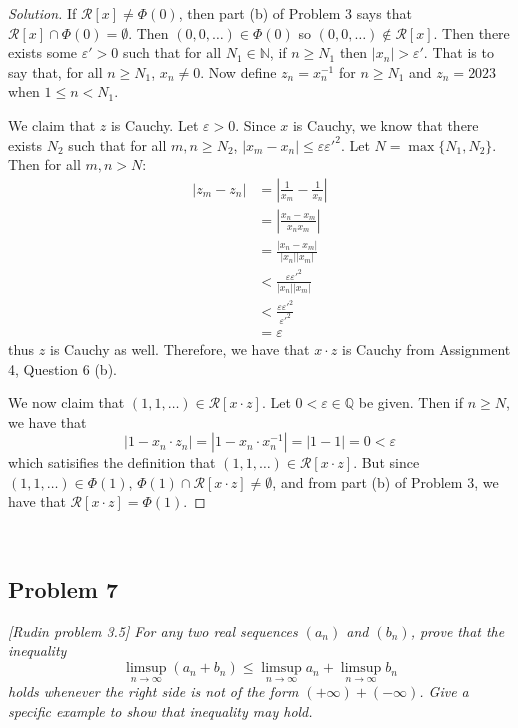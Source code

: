 \documentclass{article}
\newcommand{\N}{{\mathbb N}}
\newcommand{\Q}{{\mathbb Q}}
\newcommand{\ep}{{\varepsilon}}
\newcommand{\SR}{{\mathcal R}}
\begin{document}
\begin{proof}[Solution]\let\qed\relax
	If $\SR[x] \neq \Phi(0)$,
	then part (b) of Problem 3 says that $\SR[x] \cap \Phi(0) = \emptyset$.
	Then $(0,0,\dots) \in \Phi(0)$ so $(0,0,\dots) \not\in \SR[x]$.
	Then there exists some $\ep' > 0$ such that for all
	$N_1 \in \N$, if $n \geq N_1$ then $|x_n| > \ep'$.
	That is to say that, for all $n\geq N_1$, $x_n \neq 0$.
	Now define $z_n = x_n^{-1}$ for $n \geq N_1$ and $z_n = 2023$
	when $1 \leq n < N_1$.

	We claim that $z$ is Cauchy.
	Let $\ep > 0$.
	Since $x$ is Cauchy,
	we know that there exists $N_2$ such that for all $m,n \geq N_2$,
	$|x_m - x_n| \leq \ep\ep'^2$.
	Let $N = \max\{N_1,N_2\}$.
	Then for all $m,n > N$:
	\begin{align*}
		|z_m - z_n|
		&= \left\lvert\frac{1}{x_m} - \frac{1}{x_n}\right\rvert\\
		&= \left\lvert \frac{x_n - x_m}{x_nx_m} \right\rvert\\
		&= \frac{|x_n-x_m|}{|x_n||x_m|}\\
		&< \frac{\ep\ep'^2}{|x_n||x_m|}\\
		&< \frac{\ep\ep'^2}{\ep'^2}\\
		&= \ep
	\end{align*}
	thus $z$ is Cauchy as well.
	Therefore, we have that $x \cdot z$ is Cauchy from Assignment 4, Question 6 (b).

	We now claim that $(1,1,\dots) \in \SR[x\cdot z]$.
	Let $0 < \ep \in \Q$ be given.
	Then if $n \geq N$,
	we have that
	\[
		|1 - x_n\cdot z_n| = |1 - x_n\cdot x_n^{-1}| = |1-1| = 0 < \ep
	\]
	which satisifies the definition that $(1,1,\dots) \in \SR[x\cdot z]$.
	But since $(1,1,\dots) \in \Phi(1)$,
	$\Phi(1) \cap \SR[x \cdot z] \neq \emptyset$,
	and from part (b) of Problem 3, we have that $\SR[x\cdot z] = \Phi(1)$.
\end{proof}
\clearpage
~\clearpage

\subsection*{Problem 7}
{\it [Rudin problem 3.5]
For any two real sequences $(a_n)$ and $(b_n)$, prove that the inequality
\[
	\limsup_{n\to\infty}(a_n + b_n) \leq \limsup_{n\to\infty}a_n + \limsup_{n\to\infty}b_n
\]
holds whenever the right side is not of the form $(+\infty) + (-\infty)$.
Give a specific example to show that inequality may hold.}
\end{document}
